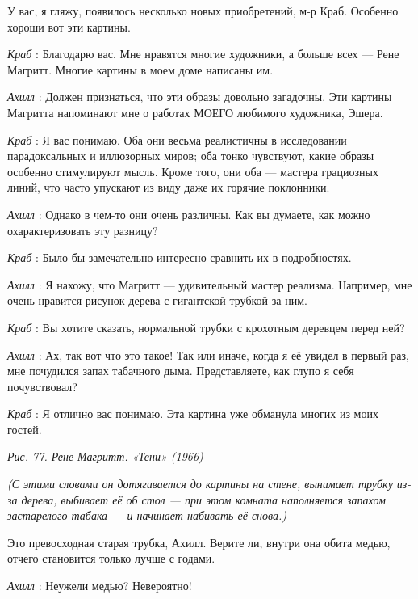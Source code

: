 \documentclass[../main.tex]{subfiles}
\begin{document}


\begin{dialogue}

 У вас, я гляжу, появилось несколько новых приобретений, м-р Краб. Особенно хороши вот эти картины.

\emph{Краб} : Благодарю вас. Мне нравятся многие художники, а больше всех --- Рене Магритт. Многие картины в моем доме написаны им.

\emph{Ахилл} : Должен признаться, что эти образы довольно загадочны. Эти картины Магритта напоминают мне о работах МОЕГО любимого художника, Эшера.

\emph{Краб} : Я вас понимаю. Оба они весьма реалистичны в исследовании парадоксальных и иллюзорных миров; оба тонко чувствуют, какие образы особенно стимулируют мысль. Кроме того, они оба --- мастера грациозных линий, что часто упускают из виду даже их горячие поклонники.

\emph{Ахилл} : Однако в чем-то они очень различны. Как вы думаете, как можно охарактеризовать эту разницу?

\emph{Краб} : Было бы замечательно интересно сравнить их в подробностях.

\emph{Ахилл} : Я нахожу, что Магритт --- удивительный мастер реализма. Например, мне очень нравится рисунок дерева с гигантской трубкой за ним.

\emph{Краб} : Вы хотите сказать, нормальной трубки с крохотным деревцем перед ней?

\emph{Ахилл} : Ах, так вот что это такое! Так или иначе, когда я её увидел в первый раз, мне почудился запах табачного дыма. Представляете, как глупо я себя почувствовал?

\emph{Краб} : Я отлично вас понимаю. Эта картина уже обманула многих из моих гостей.

\emph{Рис. 77. Рене Магритт. «Тени» (1966)}

\emph{(С этими словами он дотягивается до картины на стене, вынимает трубку из-за дерева, выбивает её об стол --- при этом комната наполняется запахом застарелого табака --- и начинает набивать её снова.)}

Это превосходная старая трубка, Ахилл. Верите ли, внутри она обита медью, отчего становится только лучше с годами.

\emph{Ахилл} : Неужели медью? Невероятно!


\end{dialogue}
\end{document}
